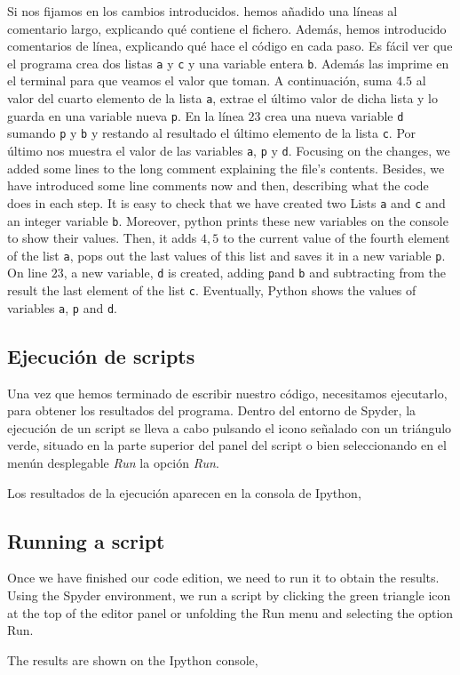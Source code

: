 \begin{paracol}{2}
Si nos fijamos en los cambios introducidos. hemos añadido una líneas al comentario largo, explicando qué contiene el fichero. Además, hemos introducido comentarios de línea, explicando qué hace el código en cada paso. Es fácil ver que el programa crea dos listas \texttt{a} y \texttt{c} y una variable entera \texttt{b}. Además las imprime en el terminal para que veamos el valor que toman. A continuación, suma $4.5$ al valor del cuarto elemento de la lista \texttt{a}, extrae el último valor de dicha lista y lo guarda en una variable nueva \texttt{p}. En la línea $23$ crea una nueva variable \texttt{d} sumando \texttt{p} y \texttt{b} y restando al resultado el último elemento de la lista \texttt{c}. Por último nos muestra el valor de las variables \texttt{a}, \texttt{p} y \texttt{d}.
\switchcolumn
Focusing on the changes, we added some lines to the long comment explaining the file's contents. Besides, we have introduced some line comments now and then, describing what the code does in each step. It is easy to check that we have created two Lists \texttt{a} and \texttt{c} and an integer variable \texttt{b}. Moreover, python prints these new variables on the console to show their values. Then, it adds $4,5$ to the current value of the fourth element of the list \texttt{a}, pops out the last values of this list and saves it in a new variable \texttt{p}. On line $23$, a new variable, \texttt{d} is created, adding  \texttt{p}and \texttt{b} and subtracting from the result the last element of the list \texttt{c}. Eventually, Python shows the values of variables \texttt{a}, \texttt{p} and \texttt{d}.

\switchcolumn
\subsection{Ejecución de scripts}
Una vez que hemos terminado de escribir nuestro código, necesitamos ejecutarlo, para obtener los resultados del programa. Dentro del entorno de Spyder, la ejecución de un script se lleva a cabo pulsando el icono señalado con un triángulo verde, situado en la parte superior del panel del script o bien seleccionando en el menún desplegable \emph{Run} la opción \emph{Run}.

Los resultados de la ejecución aparecen en la consola de Ipython,
\switchcolumn
\subsection{Running a script}
Once we have finished our code edition, we need to run it to obtain the results. Using the Spyder environment, we run a script by clicking the green triangle icon at the top of the editor panel or unfolding the Run menu and selecting the option Run.

The results are shown on the Ipython console,
\end{paracol}

